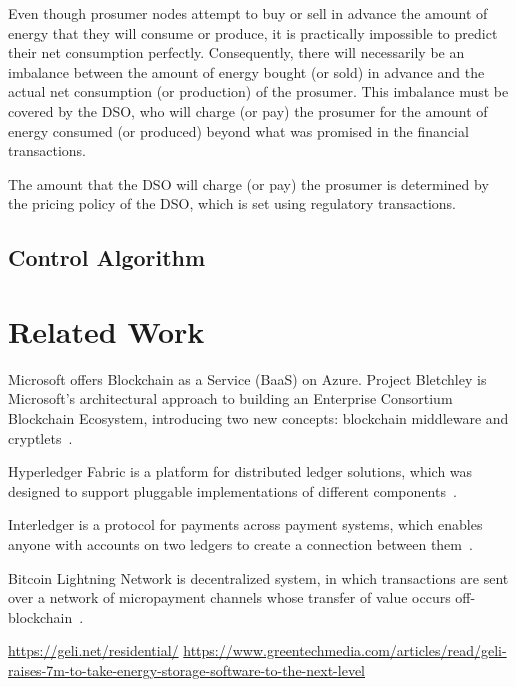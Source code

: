\documentclass[sigconf]{acmart}
\begin{document}
Even though prosumer nodes attempt to buy or sell in advance the amount of energy that they will consume or produce, it is practically impossible to predict their net consumption perfectly.
Consequently, there will necessarily be an imbalance between the amount of energy bought (or sold) in advance and the actual net consumption (or production) of the prosumer.
This imbalance must be covered by the DSO, who will charge (or pay) the prosumer for the amount of energy consumed (or produced) beyond what was promised in the financial transactions.

The amount that the DSO will charge (or pay) the prosumer is determined by the pricing policy of the DSO, which is set using regulatory transactions.


\subsection{Control Algorithm}




\section{Related Work}

Microsoft offers Blockchain as a Service (BaaS) on Azure.
Project Bletchley is Microsoft's architectural approach to building an Enterprise Consortium Blockchain Ecosystem, introducing two new concepts: blockchain middleware and cryptlets~\cite{gray2016introducing}.

Hyperledger Fabric is a platform for distributed ledger solutions, which was designed to support pluggable implementations of different components~\cite{hyperledger2017fabric}.

Interledger is a protocol for payments across payment systems, which enables anyone with accounts on two ledgers to create
a connection between them~\cite{thomas_protocol}.

Bitcoin Lightning Network is decentralized system, in which transactions are sent over a network of micropayment channels whose transfer of value occurs off-blockchain~\cite{poon2016bitcoin}.

\url{https://geli.net/residential/}
\url{https://www.greentechmedia.com/articles/read/geli-raises-7m-to-take-energy-storage-software-to-the-next-level}




\end{document}

